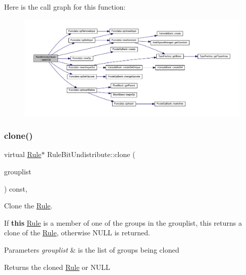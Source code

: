 Here is the call graph for this function\+:
\nopagebreak
\begin{figure}[H]
\begin{center}
\leavevmode
\includegraphics[width=350pt]{class_rule_bit_undistribute_a01122a111d9e7ff6d741128cb8d9999d_cgraph}
\end{center}
\end{figure}
\mbox{\label{class_rule_bit_undistribute_a496c93a2aad0d79a776a71160529d830}} 
\subsubsection{\texorpdfstring{clone()}{clone()}}
{\footnotesize\ttfamily virtual \mbox{\hyperlink{class_rule}{Rule}}$\ast$ Rule\+Bit\+Undistribute\+::clone (\begin{DoxyParamCaption}\item[{const \mbox{\hyperlink{class_action_group_list}{Action\+Group\+List}} \&}]{grouplist }\end{DoxyParamCaption}) const\hspace{0.3cm}{\ttfamily [inline]}, {\ttfamily [virtual]}}



Clone the \mbox{\hyperlink{class_rule}{Rule}}. 

If {\bfseries{this}} \mbox{\hyperlink{class_rule}{Rule}} is a member of one of the groups in the grouplist, this returns a clone of the \mbox{\hyperlink{class_rule}{Rule}}, otherwise N\+U\+LL is returned. 
\begin{DoxyParams}{Parameters}
{\em grouplist} & is the list of groups being cloned \\
\hline
\end{DoxyParams}
\begin{DoxyReturn}{Returns}
the cloned \mbox{\hyperlink{class_rule}{Rule}} or N\+U\+LL 
\end{DoxyReturn}


